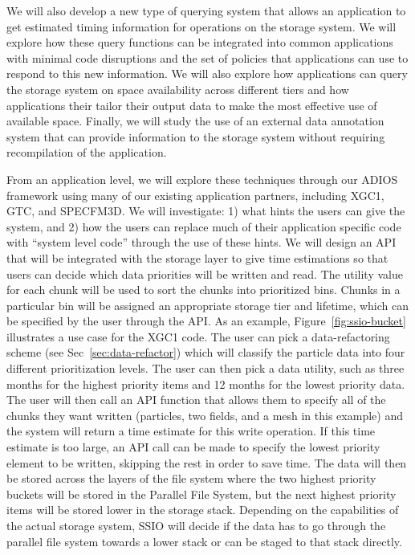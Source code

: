 We will also develop a new type of querying system that allows an application
to get estimated timing information for operations on the storage system.
We will explore
how these query functions can be integrated into common applications with
minimal code disruptions and the set of policies that applications can use to
respond to this new information. We will also explore how applications can
query the storage system on space availability across different tiers and how
applications their tailor their output data to make the most effective use of
available space.
Finally, we will study the use of an external data annotation system that can
provide information to the storage system without requiring recompilation of the application.

%
From an application level, we will explore these techniques through our ADIOS
framework using many of our existing application partners, including
XGC1, GTC, and SPECFM3D. We will investigate: 1) what hints the users can give
the system, and 2) how the users can replace much of their
application specific code with
``system level code'' through the use of these hints.  We will design an API
that will be integrated with the storage layer to give time estimations so that
users can decide which data priorities will be written and read. The utility
value for each chunk will be used to sort the chunks into prioritized bins.
Chunks in a particular bin will be assigned an appropriate storage
tier and lifetime, which can be specified by the user through the API.
As an example, Figure~\ref{fig:ssio-bucket} illustrates a use case for the XGC1 code.
The user can pick a data-refactoring scheme (see
Sec~\ref{sec:data-refactor}) which will classify the particle data into four different
prioritization levels. The user can then pick a data utility, such as three months
for the highest priority items and 12 months for the lowest priority data.
The user will then call an API function that allows them
to specify all of the chunks they want
written (particles, two fields, and a mesh in this example) and the system
will return a time estimate for this write operation.
If this time estimate is too large, an API call can be made to 
specify the lowest priority element to be written, skipping the rest in order to save time.
The data will then be stored
across the layers of the file system where the two highest priority buckets
will be stored in the Parallel File System, but the next highest priority items
will be stored lower in the storage stack. Depending on the capabilities of the actual storage system, 
SSIO will decide if the data has to go through the parallel file system 
towards a lower stack or can be staged to that stack directly. 

